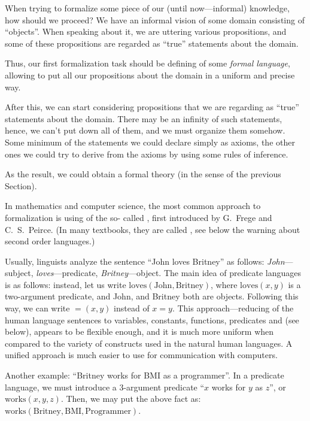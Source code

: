 When trying to formalize some piece of our (until now---informal) knowledge, how should we proceed?
We have an informal vision of some domain consisting of ``objects''.
When speaking about it, we are uttering various propositions, and some of these propositions are regarded as ``true'' statements about the domain.

Thus, our first formalization task should be defining of some \emph{formal language}, allowing to put all our propositions about the domain in a uniform and precise way.

After this, we can start considering propositions that we are regarding as ``true'' statements about the domain.
There may be an infinity of such statements, hence, we can't put down all of them, and we must organize them somehow.
Some minimum of the statements we could declare simply as axioms, the other ones we could try to derive from the axioms by using some rules of inference.

As the result, we could obtain a formal theory (in the sense of the previous Section).

In mathematics and computer science, the most common approach to formalization is using of the so-
called , first introduced by G.~Frege and C.~S.~Peirce.
(In many textbooks, they are called , see below the warning about second order languages.)

Usually, linguists analyze the sentence ``John loves Britney'' as follows: \emph{John}---subject, \emph{loves}---predicate, \emph{Britney}---object.
The main idea of predicate languages is as follows: instead, let us write \(\mathrm{loves}(\mathrm{John},\mathrm{Britney})\), where \(\mathrm{loves}(x,y)\) is a two-argument predicate, and John, and Britney both are objects.
Following this way, we can write \(=(x, y)\) instead of \(x=y\).
This approach---reducing of the human language sentences to variables, constants, functions, predicates and  (see below), appears to be flexible enough, and it is much more uniform when compared to the variety of constructs used in the natural human languages.
A unified approach is much easier to use for communication with computers.

Another example: ``Britney works for BMI as a programmer''.
In a predicate language, we must introduce a 3-argument predicate ``\(x\) works for \(y\) as \(z\)'', or \(\mathrm{works}(x, y, z)\).
Then, we may put the above fact as: \(\mathrm{works}(\mathrm{Britney}, \mathrm{BMI}, \mathrm{Programmer})\).

